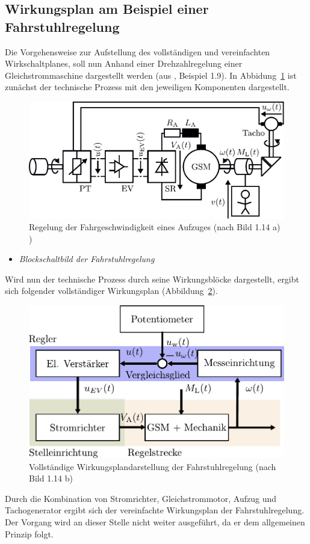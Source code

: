 \subsection{Wirkungsplan am Beispiel einer Fahrstuhlregelung}
%
Die Vorgehensweise zur Aufstellung des vollständigen und vereinfachten Wirkschaltplanes, soll nun Anhand einer Drehzahlregelung einer Gleichstrommaschine dargestellt werden (aus \cite{MSF05}, Beispiel 1.9). In Abbidung~\ref{fig:aufzug} ist zunächst der technische Prozess mit den jeweiligen Komponenten dargestellt.
%
\begin{figure}[ht!]
	\centering
	\includegraphics[width=0.83\linewidth]{Abbildungen/Grundbegriffe/PDF/Fahrstuhlregelung.pdf}
	\caption{Regelung der Fahrgeschwindigkeit eines Aufzuges (nach \cite{MSF05} Bild 1.14 a) )}
	\label{fig:aufzug}
\end{figure}
%
\begin{Aufgaben}{}{}
	\begin{itemize}
		\item \textit{Blockschaltbild der Fahrstuhlregelung}
	\end{itemize}
\end{Aufgaben}
%
Wird nun der technische Prozess durch seine Wirkungsblöcke dargestellt, ergibt sich folgender vollständiger Wirkungsplan (Abbildung~\ref{fig:aufzugwirkvoll}).  
%
\begin{figure}[ht!]
	\centering
	\includegraphics[width=0.7\linewidth]{Abbildungen/Grundbegriffe/PDF/FahrstuhlregelungWirkungsplan.pdf}
	\caption{Vollständige Wirkungsplandarstellung der Fahrstuhlregelung (nach \cite{MSF05} Bild 1.14 b)}
	\label{fig:aufzugwirkvoll}
\end{figure}
%
Durch die Kombination von Stromrichter, Gleichstrommotor, Aufzug und Tachogenerator ergibt sich der vereinfachte Wirkungsplan der Fahrstuhlregelung. Der Vorgang wird an dieser Stelle nicht weiter ausgeführt, da er dem allgemeinen Prinzip folgt.
%
